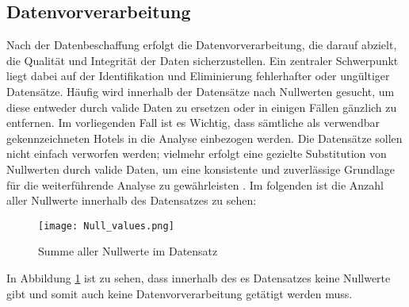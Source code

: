 \subsection{Datenvorverarbeitung}
\label{subsec:Datenvorverarbeitung}
Nach der Datenbeschaffung erfolgt die Datenvorverarbeitung, die darauf abzielt, die Qualität und Integrität der Daten sicherzustellen. Ein zentraler Schwerpunkt liegt dabei auf der Identifikation und Eliminierung fehlerhafter oder ungültiger Datensätze. Häufig wird innerhalb der Datensätze nach Nullwerten gesucht, um diese entweder durch valide Daten zu ersetzen oder in einigen Fällen gänzlich zu entfernen. Im vorliegenden Fall ist es Wichtig, dass sämtliche als verwendbar gekennzeichneten Hotels in die Analyse einbezogen werden. Die Datensätze sollen nicht einfach verworfen werden; vielmehr erfolgt eine gezielte Substitution von Nullwerten durch valide Daten, um eine konsistente und zuverlässige Grundlage für die weiterführende Analyse zu gewährleisten \cite{Agarwal.05.10.2018}.
\newline
\newline
Im folgenden ist die Anzahl aller Nullwerte innerhalb des Datensatzes zu sehen:
\begin{figure}[h]
    \centering
    \texttt{[image: Null\_values.png]}
    \caption[Summe aller Nullwerte im Datensatz]{Summe aller Nullwerte im Datensatz}
    \label{img:null_values}
\end{figure}

In Abbildung \ref{img:null_values} ist zu sehen, dass innerhalb des es Datensatzes keine Nullwerte gibt und somit auch keine Datenvorverarbeitung getätigt werden muss.
